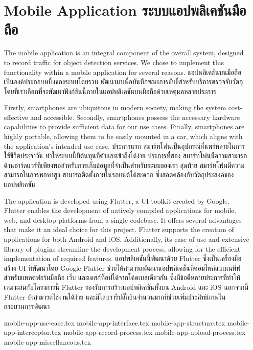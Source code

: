 \clearpage

\section{\ifenglish Mobile Application \else ระบบแอปพลิเคชันมือถือ \fi}
\ifenglish
The mobile application is an integral component of the overall system, designed to record traffic for object detection services. We chose to implement this functionality within a mobile application for several reasons.
\else
แอปพลิเคชันบนมือถือเป็นองค์ประกอบหนึ่งของระบบโดยรวม พัฒนามาเพื่อบันทึกขณะการขับขี่สำหรับบริการตรวจจับวัตถุ โดยที่เราเลือกที่จะพัฒนาฟังก์ชันนี้ภายในแอปพลิเคชันบนมือถือด้วยเหตุผลหลายประการ
\fi

\ifenglish
Firstly, smartphones are ubiquitous in modern society, making the system cost-effective and accessible. Secondly, smartphones possess the necessary hardware capabilities to provide sufficient data for our use cases. Finally, smartphones are highly portable, allowing them to be easily mounted in a car, which aligns with the application's intended use case.
\else
ประการแรก สมาร์ทโฟนเป็นอุปกรณ์ที่แพร่หลายในการใช้ชีวิตประจำวัน ทำให้ระบบนี้มีต้นทุนที่ต่ำและเข้าถึงได้ง่าย ประการที่สอง สมาร์ทโฟนมีความสามารถด้านฮาร์ดแวร์ที่เพียงพอสำหรับการเก็บข้อมูลที่จำเป็นสำหรับระบบของเรา สุดท้าย สมาร์ทโฟนมีความสามารถในการพกพาสูง สามารถติดตั้งภายในรถยนต์ได้สะดวก ซึ่งสอดคล้องกับวัตถุประสงค์ของแอปพลิเคชัน
\fi

\ifenglish
The application is developed using Flutter, a UI toolkit created by Google. Flutter enables the development of natively compiled applications for mobile, web, and desktop platforms from a single codebase. It offers several advantages that make it an ideal choice for this project. Flutter supports the creation of applications for both Android and iOS. Additionally, its ease of use and extensive library of plugins streamline the development process, allowing for the efficient implementation of required features.
\else
แอปพลิเคชันนี้พัฒนาด้วย Flutter ซึ่งเป็นเครื่องมือสร้าง UI ที่พัฒนาโดย Google Flutter ช่วยให้สามารถพัฒนาแอปพลิเคชันที่คอมไพล์แบบเนทีฟสำหรับแพลตฟอร์มมือถือ เว็บ และเดสก์ท็อปได้จากโค้ดเบสเดียวกัน ซึ่งมีข้อดีหลายประการที่ทำให้เหมาะสมกับโครงการนี้ Flutter รองรับการสร้างแอปพลิเคชันทั้งบน Android และ iOS นอกจากนี้ Flutter ยังสามารถใช้งานได้ง่าย และมีไลบรารีปลั๊กอินจำนวนมากที่ช่วยเพิ่มประสิทธิภาพในกระบวนการพัฒนา
\fi

\newcommand{\mobileDir}{chapters/approach/mobile-app}
{mobile-app-use-case.tex}
{mobile-app-interface.tex}
{mobile-app-structure.tex}
{mobile-app-interceptor.tex}
{mobile-app-record-process.tex}
{mobile-app-upload-process.tex}
{mobile-app-miscellaneous.tex}
